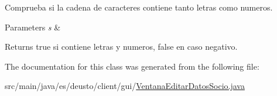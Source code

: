 Comprueba si la cadena de caracteres contiene tanto letras como numeros. 
\begin{DoxyParams}{Parameters}
{\em s} & \\
\hline
\end{DoxyParams}
\begin{DoxyReturn}{Returns}
true si contiene letras y numeros, false en caso negativo. 
\end{DoxyReturn}


The documentation for this class was generated from the following file\+:\begin{DoxyCompactItemize}
\item 
src/main/java/es/deusto/client/gui/\mbox{\hyperlink{_ventana_editar_datos_socio_8java}{Ventana\+Editar\+Datos\+Socio.\+java}}\end{DoxyCompactItemize}
